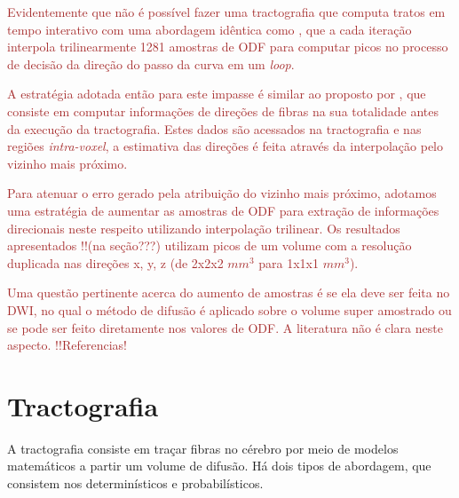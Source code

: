 \documentclass[
    12pt,                %
    oneside,            %
    a4paper,            %
    english,            %
    french,                %
    spanish,            %
    brazil                %
    ]{abntex2}
\begin{document}
\textcolor{brown}{
Evidentemente que não é possível fazer uma tractografia que computa tratos em tempo interativo com uma abordagem idêntica como , que a cada iteração interpola trilinearmente 1281 amostras de ODF para computar picos no processo de decisão da direção do passo da curva em um \textit{loop}.
}



\textcolor{brown}{
A estratégia adotada então para este impasse é similar ao proposto por , que consiste em computar informações de direções de fibras na sua totalidade antes da execução da tractografia. Estes dados são acessados na tractografia e nas regiões \textit{intra-voxel}, a estimativa das direções é feita através da interpolação pelo vizinho mais próximo.
}

\textcolor{brown}{
Para atenuar o erro gerado pela atribuição do vizinho mais próximo, adotamos uma estratégia de aumentar as amostras de ODF para extração de informações direcionais neste respeito utilizando interpolação trilinear. Os resultados apresentados !!(na seção???) utilizam picos de um volume com a resolução duplicada nas direções x, y, z (de 2x2x2 $mm^3$ para 1x1x1 $mm^3$).
}

\textcolor{brown}{
Uma questão pertinente acerca do aumento de amostras é se ela deve ser feita no DWI, no qual o método de difusão é aplicado sobre o volume super amostrado ou se pode ser feito diretamente nos valores de ODF. A literatura não é clara neste aspecto. !!Referencias!
}


\section{Tractografia}
\label{sec::decisoesiniciais_tractografia}

A tractografia consiste em traçar fibras no cérebro por meio de modelos matemáticos a partir um volume de difusão. Há dois tipos de abordagem, que consistem nos determinísticos e probabilísticos.
\end{document}
